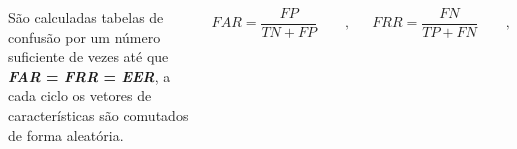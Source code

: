\begin{frame}
{\begin{columns}
					\par São calculadas tabelas de confusão por um número suficiente de vezes até que \textbf{\textit{FAR} = \textit{FRR} = \textit{EER}}, a cada ciclo os vetores de características são comutados de forma aleatória.\newline

					\begin{equation}
						FAR=\dfrac{FP}{TN+FP} \qquad,
						\label{eq:FAR}
					\end{equation}
					
					\begin{equation}
						FRR=\dfrac{FN}{TP+FN} \qquad,
						\label{eq:FRR}
					\end{equation}
				\end{columns}
		}
\end{frame}